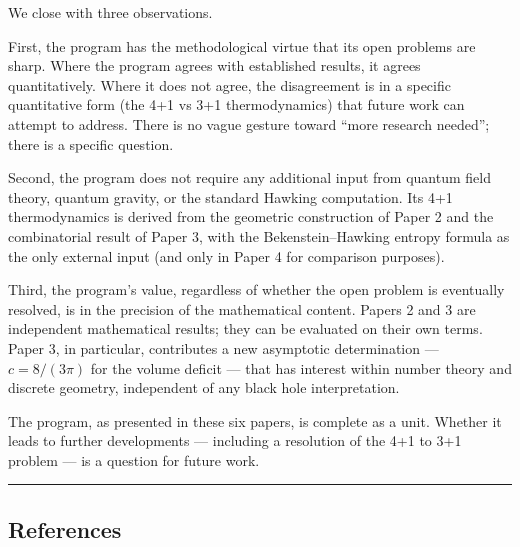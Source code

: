 \documentclass[a4paper,11pt]{article}
\theoremstyle{definition}
\begin{document}
We close with three observations.

First, the program has the methodological virtue that its open problems
are sharp. Where the program agrees with established results, it agrees
quantitatively. Where it does not agree, the disagreement is in a
specific quantitative form (the 4+1 vs 3+1 thermodynamics) that future
work can attempt to address. There is no vague gesture toward ``more
research needed''; there is a specific question.

Second, the program does not require any additional input from quantum
field theory, quantum gravity, or the standard Hawking computation. Its
4+1 thermodynamics is derived from the geometric construction of Paper 2
and the combinatorial result of Paper 3, with the Bekenstein--Hawking
entropy formula as the only external input (and only in Paper 4 for
comparison purposes).

Third, the program's value, regardless of whether the open problem is
eventually resolved, is in the precision of the mathematical content.
Papers 2 and 3 are independent mathematical results; they can be
evaluated on their own terms. Paper 3, in particular, contributes a new
asymptotic determination --- \(c = 8/(3\pi)\) for the volume deficit ---
that has interest within number theory and discrete geometry,
independent of any black hole interpretation.

The program, as presented in these six papers, is complete as a unit.
Whether it leads to further developments --- including a resolution of
the 4+1 to 3+1 problem --- is a question for future work.

\begin{center}\rule{0.5\linewidth}{0.5pt}\end{center}

\subsection{References}\label{references}
\end{document}
